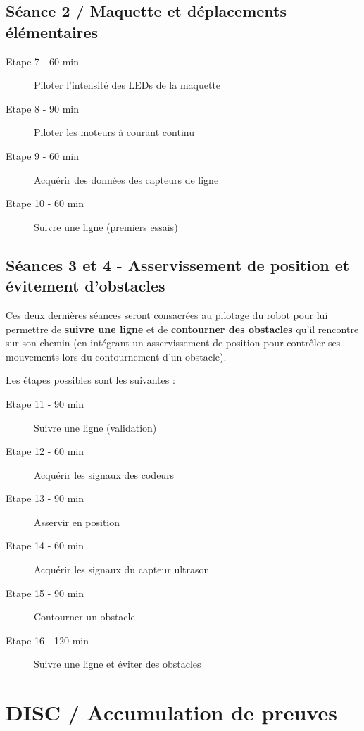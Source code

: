 \documentclass[a4paper,12pt,titlepage]{article} %
\begin{document}
\subsection{Séance 2 / Maquette et déplacements élémentaires}

	\begin{description}
		\item[Etape 7 - 60 min] Piloter l'intensité des LEDs de la maquette
		\item[Etape 8 - 90 min] Piloter les moteurs à courant continu
		\item[Etape 9 - 60 min] Acquérir des données des capteurs de ligne
		\item[Etape 10 - 60 min] Suivre une ligne (premiers essais)
	\end{description}


\subsection{Séances 3 et 4 - Asservissement de position et évitement d'obstacles}

Ces deux dernières séances seront consacrées au pilotage du robot pour lui permettre de \textbf{suivre une ligne} et de \textbf{contourner des obstacles} qu'il rencontre sur son chemin (en intégrant un asservissement de position pour contrôler ses mouvements lors du contournement d'un obstacle).

Les étapes possibles sont les suivantes :

\begin{description}
	\item[Etape 11 - 90 min] Suivre une ligne (validation)
	\item[Etape 12 - 60 min] Acquérir les signaux des codeurs
	\item[Etape 13 - 90 min] Asservir en position
	\item[Etape 14 - 60 min] Acquérir les signaux du capteur ultrason
	\item[Etape 15 - 90 min] Contourner un obstacle
	\item[Etape 16 - 120 min] Suivre une ligne et éviter des obstacles
\end{description}



\section{DISC / Accumulation de preuves}
\end{document}
